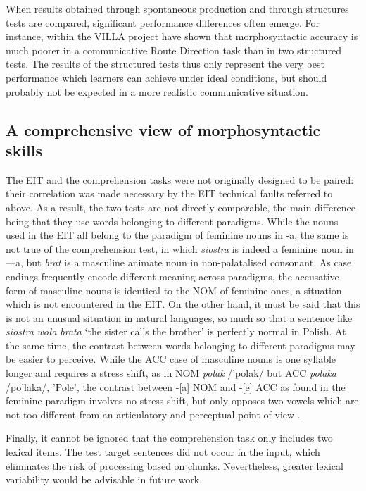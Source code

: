 When results obtained through spontaneous production and through structures tests are compared, significant performance differences often emerge. For instance, within the VILLA project \citet{WatorekEtAl2016} have shown that morphosyntactic accuracy is much poorer in a communicative Route Direction task than in two structured tests. The results of the structured tests thus only represent the very best performance which learners can achieve under ideal conditions, but should probably not be expected in a more realistic communicative situation.

\subsection{A comprehensive view of morphosyntactic skills}\label{sec:08:6.3}

The EIT and the comprehension tasks were not originally designed to be paired: their correlation was made necessary by the EIT technical faults referred to above. As a result, the two tests are not directly comparable, the main difference being that they use words belonging to different paradigms. While the nouns used in the EIT all belong to the paradigm of feminine nouns in -a, the same is not true of the comprehension test, in which \textit{siostra} is indeed a feminine noun in —a, but \textit{brat} is a masculine animate noun in non-palatalised consonant. As case endings frequently encode different meaning across paradigms, the accusative form of masculine nouns is identical to the NOM of feminine ones, a situation which is not encountered in the EIT. On the other hand, it must be said that this is not an unusual situation in natural languages, so much so that a sentence like \textit{siostra} \textit{woła} \textit{brata} ‘the sister calls the brother’ is perfectly normal in Polish. At the same time, the contrast between words belonging to different paradigms may be easier to perceive. While the ACC case of masculine nouns is one syllable longer and requires a stress shift, as in NOM \textit{polak} /'polak/ but ACC \textit{polaka} /po'laka/, 'Pole', the contrast between -[a] NOM and -[e] ACC as found in the feminine paradigm involves no stress shift, but only opposes two vowels which are not too different from an articulatory and perceptual point of view \citep{SisinniEtAl2013}.

Finally, it cannot be ignored that the comprehension task only includes two lexical items. The test target sentences did not occur in the input, which eliminates the risk of processing based on chunks. Nevertheless, greater lexical variability would be advisable in future work.
